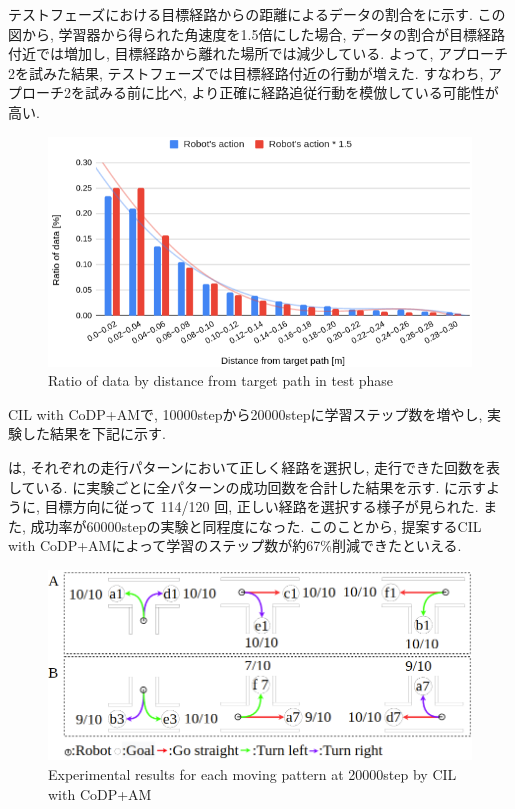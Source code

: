 
  テストフェーズにおける目標経路からの距離によるデータの割合をに示す. この図から, 学習器から得られた角速度を1.5倍にした場合, データの割合が目標経路付近では増加し, 目標経路から離れた場所では減少している. よって, アプローチ2を試みた結果, テストフェーズでは目標経路付近の行動が増えた. すなわち, アプローチ2を試みる前に比べ, より正確に経路追従行動を模倣している可能性が高い.

  \begin{figure}[hbtp]
    \centering
   \includegraphics[keepaspectratio, scale=0.37]
        {images/hist_act_test2.png}
   \caption{Ratio of data by distance from target path in test phase}
   \label{Fig:hist_act_test}
  \end{figure}  



CIL with CoDP+AMで, 10000stepから20000stepに学習ステップ数を増やし, 実験した結果を下記に示す.

は, それぞれの走行パターンにおいて正しく経路を選択し, 走行できた回数を表している.  に実験ごとに全パターンの成功回数を合計した結果を示す.  に示すように, 目標方向に従って 114/120 回, 正しい経路を選択する様子が見られた. また, 成功率が60000stepの実験と同程度になった. このことから, 提案するCIL with CoDP+AMによって学習のステップ数が約67\%削減できたといえる.

\begin{figure}[hbtp]
  \centering
 \includegraphics[keepaspectratio, scale=0.42]
      {images/20000step_act1.5.png}
 \caption{Experimental results for each moving pattern at 20000step by CIL with CoDP+AM}
 \label{Fig:20000step_act1.5}
\end{figure} 


